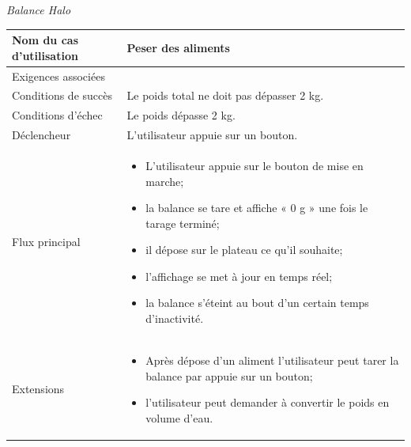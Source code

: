 \documentclass[11pt,oneside]{article}
\begin{document}
\begin{exemple}
\textit{Balance Halo}

\begin{center}
\begin{tabular}{|p{4cm}|p{10cm}|}
\hline 
Nom du cas d’utilisation & Peser des aliments
 \\ \hline
Exigences associées & \\ \hline
Conditions de succès & Le poids total ne doit pas dépasser 2 kg. \\ \hline
Conditions d’échec & Le poids dépasse 2 kg. \\ \hline
Déclencheur & L’utilisateur appuie sur un bouton.\\ \hline
Flux principal & 
\begin{itemize}
\item L’utilisateur appuie sur le bouton de mise en marche;
\item la balance se tare et affiche « 0 g » une fois le tarage terminé;
\item il dépose sur le plateau ce qu’il souhaite;
\item l’affichage se met à jour en temps réel;
\item la balance s’éteint au bout d’un certain temps d’inactivité.
\end{itemize}
\\ \hline
Extensions &
  \begin{itemize}
\item Après dépose d’un aliment l’utilisateur peut tarer la balance par appuie sur
un bouton;
\item l’utilisateur peut demander à convertir le poids en volume d’eau.
\end{itemize}\\ \hline
\end{tabular}
\end{center}
\end{exemple}




\begin{thebibliography}{2}
\end{thebibliography}
\end{document}
